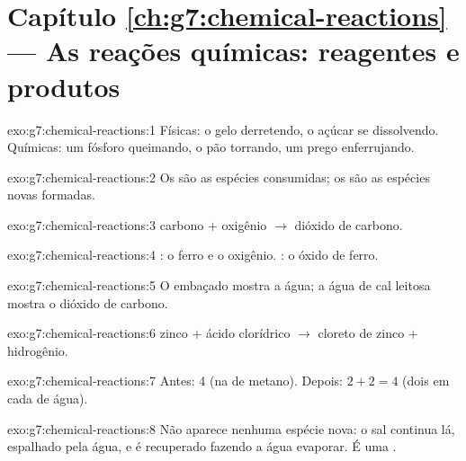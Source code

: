 \section*{Capítulo \ref{ch:g7:chemical-reactions} --- As reações químicas: reagentes e produtos}

\begin{solution}{exo:g7:chemical-reactions:1}
Físicas: o gelo derretendo, o açúcar se dissolvendo. Químicas: um
fósforo queimando, o pão torrando, um prego enferrujando.
\end{solution}

\begin{solution}{exo:g7:chemical-reactions:2}
Os  são as espécies consumidas; os  são as espécies
novas formadas.
\end{solution}

\begin{solution}{exo:g7:chemical-reactions:3}
carbono $+$ oxigênio $\longrightarrow$ dióxido de carbono.
\end{solution}

\begin{solution}{exo:g7:chemical-reactions:4}
: o ferro e o oxigênio. : o óxido de ferro.
\end{solution}

\begin{solution}{exo:g7:chemical-reactions:5}
O embaçado mostra a água; a água de cal leitosa mostra o dióxido de carbono.
\end{solution}

\begin{solution}{exo:g7:chemical-reactions:6}
zinco $+$ ácido clorídrico $\longrightarrow$ cloreto de zinco $+$ hidrogênio.
\end{solution}

\begin{solution}{exo:g7:chemical-reactions:7}
Antes: 4 (na  de metano). Depois: $2 + 2 = 4$ (dois em cada
 de água).
\end{solution}

\begin{solution}{exo:g7:chemical-reactions:8}
Não aparece nenhuma espécie nova: o sal continua lá, espalhado pela
água, e é recuperado fazendo a água evaporar. É uma .
\end{solution}

